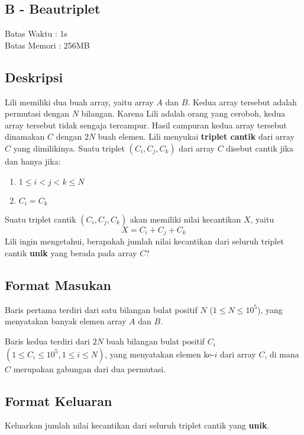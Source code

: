 \documentclass{article}
\begin{document}
\begin{center}
    \section*{B - Beautriplet} %
    Batas Waktu : 1s \\  %
    Batas Memori :  256MB \\ %
\end{center}

\subsection*{Deskripsi}

Lili memiliki dua buah array, yaitu array $A$ dan $B$. Kedua array tersebut adalah permutasi dengan $N$ bilangan. Karena Lili adalah orang yang ceroboh, kedua array tersebut tidak sengaja tercampur. Hasil campuran kedua array tersebut dinamakan $C$ dengan $2N$ buah elemen. 
Lili menyukai \textbf{triplet cantik} dari array $C$ yang dimilikinya. Suatu triplet $(C_i, C_j, C_k)$ dari array $C$ disebut cantik jika dan hanya jika: 
\begin{enumerate}
    \item $1\le i<j<k\le N$
    \item $C_i=C_k$
\end{enumerate}
Suatu triplet cantik $(C_i, C_j, C_k)$ akan memiliki nilai kecantikan $X$, yaitu $$X=C_i+C_j+C_k$$ Lili ingin mengetahui, berapakah jumlah nilai kecantikan dari seluruh triplet cantik \textbf{unik} yang berada pada array $C$?

\subsection*{Format Masukan}

Baris pertama terdiri dari satu bilangan bulat positif $N$ ($1\le N\le 10^5$), yang menyatakan banyak elemen array $A$ dan $B$.

Baris kedua terdiri dari $2N$ buah bilangan bulat positif $C_i$ $(1 \leq C_i \leq 10^5, 1 \leq i \leq N)$, yang menyatakan elemen ke-$i$ dari array $C$, di mana $C$ merupakan gabungan dari dua permutasi.

\subsection*{Format Keluaran}

Keluarkan jumlah nilai kecantikan dari seluruh triplet cantik yang \textbf{unik}.
\\
\end{document}
